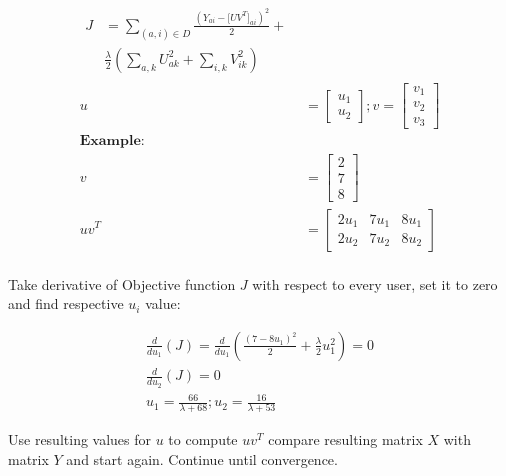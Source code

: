 \begin{align*}
\begin{split}
\displaystyle J &= \sum _{(a,i) \in D} \frac{(Y_{ai} - \big [UV^ T\big ]_{ai})^2}{2} + \\
& \frac{\lambda }{2} \left(\sum _{a,k} U_{ak}^2 + \sum _{i,k} V_{ik}^2\right)
\end{split} \\
u&=
\begin{bmatrix}
u_1\\
u_2
\end{bmatrix};  
v=
\begin{bmatrix}
v_1\\
v_2\\
v_3
\end{bmatrix}\\
\textbf{Example:}\\
v&=
\begin{bmatrix}
2\\
7\\
8
\end{bmatrix}\\
uv^T& = \begin{bmatrix}
2u_1 & 7u_1 & 8u_1\\
2u_2 & 7u_2 & 8u_2
\end{bmatrix}\\
\end{align*}

Take derivative of Objective function $J$ with respect to every user, set it to zero and find respective $u_i$ value:

\begin{align*}
\frac{d}{du_1}(J)=\frac{d}{du_1}( \frac{(7-8u_1)^2}{2} + \frac{\lambda}{2} u_1^2) = 0\\
\frac{d}{du_2}(J) = 0\\
u_1 = \frac{66}{\lambda + 68};
u_2 = \frac{16}{\lambda +53}
\end{align*}

Use resulting values for $u$ to compute $uv^T$ compare resulting matrix $X$ with matrix $Y$ and start again. Continue until convergence.